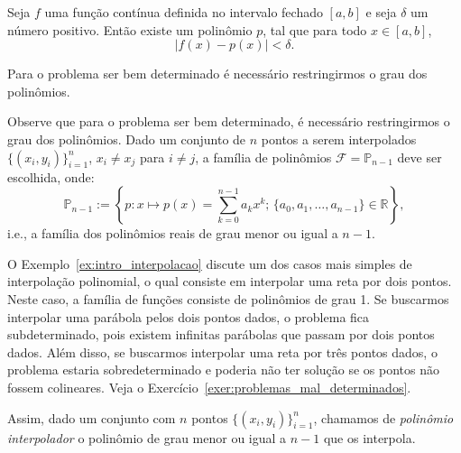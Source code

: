 \begin{teo}[Weierstrass]Seja $f$ uma função contínua definida no intervalo fechado $[a,b]$ e seja $\delta$ um número positivo. Então existe um polinômio $p$, tal que para todo $x\in[a,b]$,
	\begin{equation*}
	|f(x)-p(x)|<\delta.
	\end{equation*}
\end{teo}

Para o problema ser bem determinado é necessário restringirmos o grau dos polinômios. 

Observe que para o problema ser bem determinado, é necessário restringirmos o grau dos polinômios. Dado um conjunto de $n$ pontos a serem interpolados $\{(x_i,y_i)\}_{i=1}^{n}$, $x_i\neq x_j$ para $i\neq j$, a família de polinômios $\mathcal{F} = \mathbb{P}_{n-1}$ deve ser escolhida, onde:
\begin{equation*}
  \mathbb{P}_{n-1} := \left\{p : x\mapsto p(x) = \sum_{k=0}^{n-1}a_kx^k ;\, \{a_0,a_1,\ldots,a_{n-1}\}\in\mathbb{R}\right\},
\end{equation*}
i.e., a família dos polinômios reais de grau menor ou igual a $n-1$.

O Exemplo~\ref{ex:intro_interpolacao} discute um dos casos mais simples de interpolação polinomial, o qual consiste em interpolar uma reta por dois pontos. Neste caso, a família de funções consiste de polinômios de grau 1. Se buscarmos interpolar uma parábola pelos dois pontos dados, o problema fica subdeterminado, pois existem infinitas parábolas que passam por dois pontos dados. Além disso, se buscarmos interpolar uma reta por três pontos dados, o problema estaria sobredeterminado e poderia não ter solução se os pontos não fossem colineares. Veja o Exercício~\ref{exer:problemas_mal_determinados}.

Assim, dado um conjunto com $n$ pontos $\{(x_i,y_i)\}_{i=1}^{n}$, chamamos de \emph{polinômio interpolador} o polinômio de grau menor ou igual a $n-1$ que os interpola.


